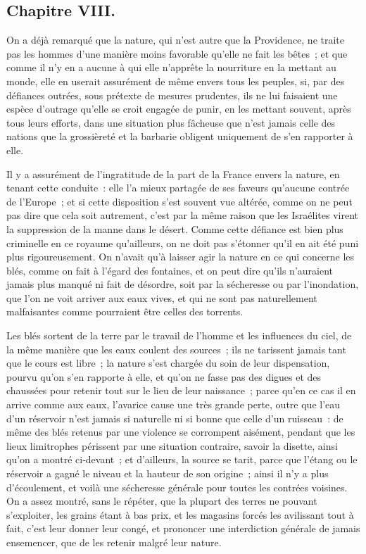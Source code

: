 \documentclass[french,twoside]{book} %
\begin{document}
\subsection[{Chapitre VIII.}]{Chapitre VIII.}
\noindent On a déjà remarqué que la nature, qui n’est autre que la Providence, ne traite pas les hommes d’une manière moins favorable qu’elle ne fait les bêtes ; et que comme il n’y en a aucune à qui elle n’apprête la nourriture en la mettant au monde, elle en userait assurément de même envers tous les peuples, si, par des défiances outrées, sous prétexte de mesures prudentes, ils ne lui faisaient une espèce d’outrage qu’elle se croit engagée de punir, en les mettant souvent, après tous leurs efforts, dans une situation plus fâcheuse que n’est jamais celle des nations que la grossièreté et la barbarie obligent uniquement de s’en rapporter à elle.\par
Il y a assurément de l’ingratitude de la part de la France envers la nature, en tenant cette conduite : elle l’a mieux partagée de ses faveurs qu’aucune contrée de l’Europe ; et si cette disposition s’est souvent vue altérée, comme on ne peut pas dire que cela soit autrement, c’est par la même raison que les Israélites virent la suppression de la manne dans le désert. Comme cette défiance est bien plus criminelle en ce royaume qu’ailleurs, on ne doit pas s’étonner qu’il en ait été puni plus rigoureusement. On n’avait qu’à laisser agir la nature en ce qui concerne les blés, comme on fait à l’égard des fontaines, et on peut dire qu’ils n’auraient jamais plus manqué ni fait de désordre, soit par la sécheresse ou par l’inondation, que l’on ne voit arriver aux eaux vives, et qui ne sont pas naturellement malfaisantes comme pourraient être celles des torrents.\par
Les blés sortent de la terre par le travail de l’homme et les influences du ciel, de la même manière que les eaux coulent des sources ; ils ne tarissent jamais tant que le cours est libre ; la nature s’est chargée du soin de leur dispensation, pourvu qu’on s’en rapporte à elle, et qu’on ne fasse pas des digues et des chaussées pour retenir tout sur le lieu de leur naissance ; parce qu’en ce cas il en arrive comme aux eaux, l’avarice cause une très grande perte, outre que l’eau d’un réservoir n’est jamais si naturelle ni si bonne que celle d’un ruisseau : de même des blés retenus par une violence se corrompent aisément, pendant que les lieux limitrophes périssent par une situation contraire, savoir la disette, ainsi qu’on a montré ci-devant ; et d’ailleurs, la source se tarit, parce que l’étang ou le réservoir a gagné le niveau et la hauteur de son origine ; ainsi il n’y a plus d’écoulement, et voilà une sécheresse générale pour toutes les contrées voisines. On a assez montré, sans le répéter, que la plupart des terres ne pouvant s’exploiter, les grains étant à bas prix, et les magasins forcés les avilissant tout à fait, c’est leur donner leur congé, et prononcer une interdiction générale de jamais ensemencer, que de les retenir malgré leur nature.\par
\end{document}
